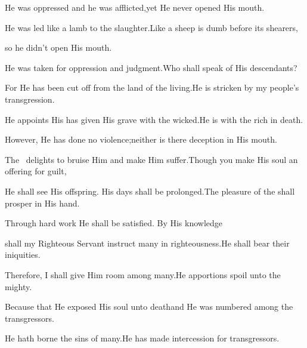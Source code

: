 \begin{inparaenum}
  \pb {} He was oppressed and he was afflicted,\pa yet He never opened His mouth.%
  
  \pb He was led like a lamb to the slaughter.\pa Like a sheep is dumb before its shearers,%
  
  \pb so he didn't open His mouth.%
  
  \pa {} He was taken for oppression and judgment.\pa Who shall speak of His descendants?%
  
  \pb For He has been cut off from the land of the living.\pa He is stricken by my people's transgression.%
  
  \pa {} He appoints His has given His grave with the wicked.\pa He is with the rich in death.%
  
  \pb However, He has done no violence;\pa neither is there deception in His mouth.%
  
  \pb {} The \lord\ delights to bruise Him and make Him suffer.\pa Though you make His soul an offering for guilt,%
  
  \pb He shall see His offspring.%
  His days shall be prolonged.\pa The pleasure of the \lord{} shall prosper in His hand.%
  
  \pa {} Through hard work He shall be satisfied.%
  \pa By His knowledge%
  
  \pb shall my Righteous Servant instruct many in righteousness.\pa He shall bear their iniquities.%
  
  \pa {} Therefore, I shall give Him room among many.\pa He apportions spoil unto the mighty.%
  
  \pb Because that He exposed His soul unto death\pa and He was numbered among the transgressors.%
  
  \pb He hath borne the sins of many.\pa He has made intercession for transgressors.%
\end{inparaenum}
